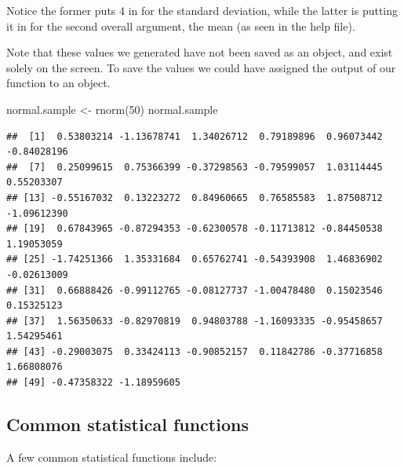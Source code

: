 \documentclass[
]{book}
\newenvironment{Shaded}{\begin{snugshade}}{\end{snugshade}}
\newcommand{\DecValTok}[1]{\textcolor[rgb]{0.00,0.00,0.81}{#1}}
\newcommand{\FunctionTok}[1]{\textcolor[rgb]{0.00,0.00,0.00}{#1}}
\newcommand{\NormalTok}[1]{#1}
\newcommand{\OtherTok}[1]{\textcolor[rgb]{0.56,0.35,0.01}{#1}}
\begin{document}
Notice the former puts 4 in for the standard deviation, while the latter is putting it in for the second overall argument, the mean (as seen in the help file).

Note that these values we generated have not been saved as an object, and exist solely on the screen. To save the values we could have assigned the output of our function to an object.

\begin{Shaded}
\begin{Highlighting}[]
\NormalTok{normal.sample }\OtherTok{\textless{}{-}} \FunctionTok{rnorm}\NormalTok{(}\DecValTok{50}\NormalTok{)}
\NormalTok{normal.sample}
\end{Highlighting}
\end{Shaded}

\begin{verbatim}
##  [1]  0.53803214 -1.13678741  1.34026712  0.79189896  0.96073442 -0.84028196
##  [7]  0.25099615  0.75366399 -0.37298563 -0.79599057  1.03114445  0.55203307
## [13] -0.55167032  0.13223272  0.84960665  0.76585583  1.87508712 -1.09612390
## [19]  0.67843965 -0.87294353 -0.62300578 -0.11713812 -0.84450538  1.19053059
## [25] -1.74251366  1.35331684  0.65762741 -0.54393908  1.46836902 -0.02613009
## [31]  0.66888426 -0.99112765 -0.08127737 -1.00478480  0.15023546  0.15325123
## [37]  1.56350633 -0.82970819  0.94803788 -1.16093335 -0.95458657  1.54295461
## [43] -0.29003075  0.33424113 -0.90852157  0.11842786 -0.37716858  1.66808076
## [49] -0.47358322 -1.18959605
\end{verbatim}

\hypertarget{common-statistical-functions}{%
\subsection*{Common statistical functions}\label{common-statistical-functions}}

A few common statistical functions include:
\end{document}
